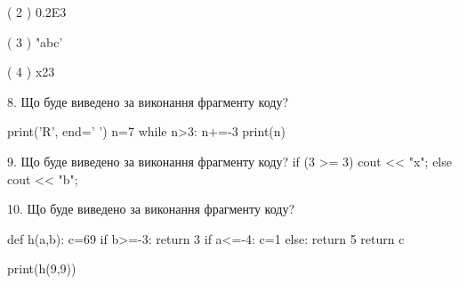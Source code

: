 \documentclass[11pt]{article}
\begin{document}
( 2 ) 0.2E3

( 3 ) "abc'

( 4 ) x23
\vspace{5mm}

8. Що буде виведено за виконання фрагменту коду?

print('R', end=' ')
n=7
while n>3:
    n+=-3
print(n)

\vspace{5mm}

9. Що буде виведено за виконання фрагменту коду?
if (3 >= 3)
    cout << "x";
else
    cout << "b";

\vspace{5mm}

10. Що буде виведено за виконання фрагменту коду?

def h(a,b):
    c=69
    if b>=-3:
        return 3
    if a<=-4:
         c=1
    else: 
        return 5
    return c

print(h(9,9))
\vspace{5mm}

\newpage
\end{document}

